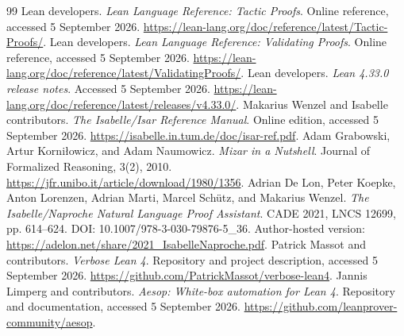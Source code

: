 \documentclass[11pt,a4paper]{article}
\theoremstyle{remark}
\begin{document}
\begin{thebibliography}{99}
 Lean developers. \emph{Lean Language Reference: Tactic Proofs}. Online reference, accessed 5 September 2026. \url{https://lean-lang.org/doc/reference/latest/Tactic-Proofs/}.
 Lean developers. \emph{Lean Language Reference: Validating Proofs}. Online reference, accessed 5 September 2026. \url{https://lean-lang.org/doc/reference/latest/ValidatingProofs/}.
 Lean developers. \emph{Lean 4.33.0 release notes}. Accessed 5 September 2026. \url{https://lean-lang.org/doc/reference/latest/releases/v4.33.0/}.
 Makarius Wenzel and Isabelle contributors. \emph{The Isabelle/Isar Reference Manual}. Online edition, accessed 5 September 2026. \url{https://isabelle.in.tum.de/doc/isar-ref.pdf}.
 Adam Grabowski, Artur Korni\l owicz, and Adam Naumowicz. \emph{Mizar in a Nutshell}. Journal of Formalized Reasoning, 3(2), 2010. \url{https://jfr.unibo.it/article/download/1980/1356}.
 Adrian De Lon, Peter Koepke, Anton Lorenzen, Adrian Marti, Marcel Sch\"utz, and Makarius Wenzel. \emph{The Isabelle/Naproche Natural Language Proof Assistant}. CADE 2021, LNCS 12699, pp. 614--624. DOI: 10.1007/978-3-030-79876-5\_36. Author-hosted version: \url{https://adelon.net/share/2021_IsabelleNaproche.pdf}.
 Patrick Massot and contributors. \emph{Verbose Lean 4}. Repository and project description, accessed 5 September 2026. \url{https://github.com/PatrickMassot/verbose-lean4}.
 Jannis Limperg and contributors. \emph{Aesop: White-box automation for Lean 4}. Repository and documentation, accessed 5 September 2026. \url{https://github.com/leanprover-community/aesop}.
\end{thebibliography}
\end{document}
